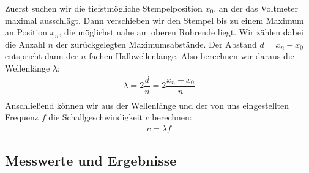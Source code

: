 \documentclass{scrartcl}
\begin{document}
Zuerst suchen wir die tiefstmögliche Stempelposition $x_{0}$, an der das Voltmeter maximal ausschlägt. Dann verschieben wir den Stempel bis zu einem Maximum an Position $x_{n}$, die möglichst nahe am oberen Rohrende liegt. Wir zählen dabei die Anzahl $n$ der zurückgelegten Maximumsabstände. Der Abstand $d = x_{n} - x_{0}$ entspricht dann der $n$-fachen Halbwellenlänge. Also berechnen wir daraus die Wellenlänge $\lambda$:
\begin{align}
\lambda = 2 \dfrac{d}{n} =  2 \dfrac{x_{n}-x_{0}}{n}\\
\end{align}
Anschließend können wir aus der Wellenlänge und der von uns eingestellten Frequenz $f$ die Schallgeschwindigkeit $c$ berechnen:
\begin{align}
c = \lambda f
\end{align}
\subsection{Messwerte und Ergebnisse}
\end{document}
